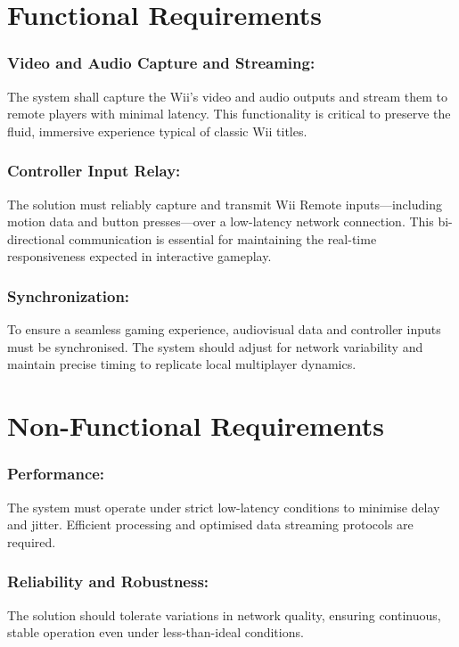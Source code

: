\label{chapter:requirements}

\section{Functional Requirements}

\subsubsection{Video and Audio Capture and Streaming:}
	      The system shall capture the Wii’s video and audio outputs and stream them to remote players with minimal latency. This functionality is critical to preserve the fluid, immersive experience typical of classic Wii titles.

\subsubsection{Controller Input Relay:}
	      The solution must reliably capture and transmit Wii Remote inputs—including motion data and button presses—over a low-latency network connection. This bi-directional communication is essential for maintaining the real-time responsiveness expected in interactive gameplay.

\subsubsection{Synchronization:}
	      To ensure a seamless gaming experience, audiovisual data and controller inputs must be synchronised. The system should adjust for network variability and maintain precise timing to replicate local multiplayer dynamics.




\section{Non-Functional Requirements}

\subsubsection{Performance:}
	      The system must operate under strict low-latency conditions to minimise delay and jitter. Efficient processing and optimised data streaming protocols are required.

\subsubsection{Reliability and Robustness:}
	      The solution should tolerate variations in network quality, ensuring continuous, stable operation even under less-than-ideal conditions.

